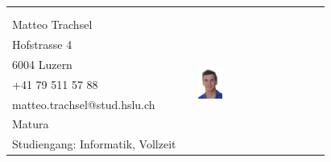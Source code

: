 \begin{tabular}{lp{3.3cm}l}
                                                & &  \\
                                                & &  \\
    Matteo Trachsel                             & &  \multirow{8}{4cm}{\includegraphics[width=0.2\textwidth]{DasTeam/Bilder/MatteoTrachsel.jpg}} \\
    Hofstrasse 4                                & &  \\
    6004 Luzern                                 & &  \\
    +41 79 511 57 88                            & &  \\
    matteo.trachsel@stud.hslu.ch                & &  \\
    Matura                                      & &  \\
    Studiengang: Informatik, Vollzeit           & &  \\
\end{tabular}
    
